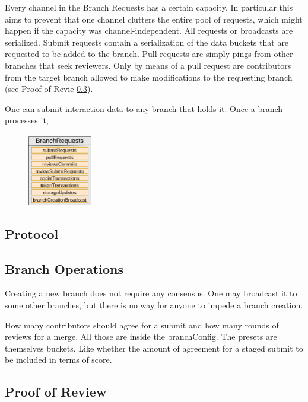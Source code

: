 \documentclass[14pt]{article}
\begin{document}
Every channel in the Branch Requests has a certain capacity. In particular this aims to prevent that one channel clutters the entire pool of requests, which might happen if the capacity was channel-independent. All requests or broadcasts are serialized. 
Submit requests contain a serialization of the data buckets that are requested to be added to the branch. Pull requests are simply pings from other branches that seek reviewers. Only by means of a pull request are contributors from the target branch allowed to make modifications to the requesting branch (see Proof of Revie \ref{ssc:consensus}).


One can submit interaction data to any branch that holds it. Once a branch processes it, 



\begin{figure}[h!]
  \begin{center}
    \includegraphics[width=0.25\textwidth]{img/MempoolV3.png}
\end{center}
 \caption{}
 \label{fig:mempool}
\end{figure}

\subsection{Protocol}
\label{ssc:protocol}

\subsection{Branch Operations}
\label{ssc:branchops}

Creating a new branch does not require any consensus. One may broadcast it to some other branches, but there is no way for anyone to impede a branch creation. 


How many contributors should agree for a submit and how many rounds of reviews for a merge. All those are inside the branchConfig.
The presets are themselves buckets. Like whether the amount of agreement for a staged submit to be included in terms of score. 

\subsection{Proof of Review}
\label{ssc:consensus}
\end{document}
